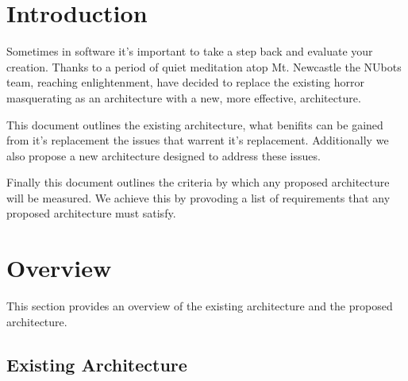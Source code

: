 \documentclass[english,12pt]{scrartcl}
\begin{document}
	\section{Introduction}
		Sometimes in software it's important to take a step back and evaluate your creation.
		Thanks to a period of quiet meditation atop Mt. Newcastle the NUbots team, reaching enlightenment, have decided
		to replace the existing horror masquerating as an architecture with a new, more effective, architecture.
		
		This document outlines the existing architecture, what benifits can be gained from it's replacement the issues that
		warrent it's replacement.
		Additionally we also propose a new architecture designed to address these issues.
		
		Finally this document outlines the criteria by which any proposed architecture will be measured. 
		We achieve this by provoding a list of requirements that any proposed architecture must satisfy.

	\section{Overview}
		This section provides an overview of the existing architecture and the proposed architecture.

		\subsection{Existing Architecture}

\end{document}

